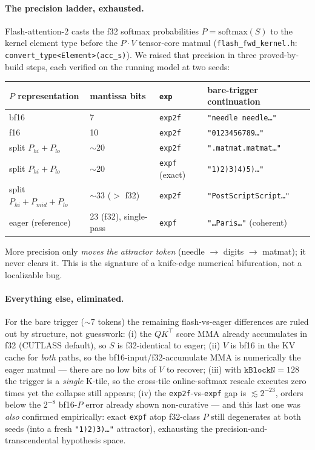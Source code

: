 \documentclass[11pt]{article}
\begin{document}
\paragraph{The precision ladder, exhausted.} Flash-attention-2 casts the f32 softmax probabilities
$P=\mathrm{softmax}(S)$ to the kernel element type before the $P\!\cdot\!V$ tensor-core matmul
(\texttt{flash\_fwd\_kernel.h}: \texttt{convert\_type<Element>(acc\_s)}). We raised that precision in
three proved-by-build steps, each verified on the running model at two seeds:
\begin{center}\small
\begin{tabular}{@{}llll@{}}
\toprule
$P$ representation & mantissa bits & \texttt{exp} & bare-trigger continuation \\
\midrule
bf16               & 7  & \texttt{exp2f} & \texttt{"needle needle\dots"} \\
f16                & 10 & \texttt{exp2f} & \texttt{"0123456789\dots"} \\
split $P_{hi}{+}P_{lo}$ & $\sim$20 & \texttt{exp2f} & \texttt{".matmat.matmat\dots"} \\
split $P_{hi}{+}P_{lo}$ & $\sim$20 & \texttt{expf} (exact) & \texttt{"1)2)3)4)5)\dots"} \\
split $P_{hi}{+}P_{mid}{+}P_{lo}$ & $\sim$33 ($>$ f32) & \texttt{exp2f} & \texttt{"PostScriptScript\dots"} \\
eager (reference)  & 23 (f32), single-pass & \texttt{expf} & \texttt{"\dots Paris\dots"} (coherent) \\
\bottomrule
\end{tabular}
\end{center}
More precision only \emph{moves the attractor token} (needle $\to$ digits $\to$ matmat); it never
clears it. This is the signature of a knife-edge numerical bifurcation, not a localizable bug.

\paragraph{Everything else, eliminated.} For the bare trigger ($\sim$7 tokens) the remaining
flash-vs-eager differences are ruled out by structure, not guesswork: (i) the $QK^\top$ score MMA
already accumulates in f32 (CUTLASS default), so $S$ is f32-identical to eager; (ii) $V$ is bf16 in
the KV cache for \emph{both} paths, so the bf16-input/f32-accumulate MMA is numerically the eager
matmul --- there are no low bits of $V$ to recover; (iii) with $\texttt{kBlockN}=128$ the trigger is
a \emph{single} K-tile, so the cross-tile online-softmax rescale executes zero times yet the collapse
still appears; (iv) the \texttt{exp2f}-vs-\texttt{expf} gap is $\lesssim 2^{-23}$, orders below the
$2^{-8}$ bf16-$P$ error already shown non-curative --- and this last one was \emph{also} confirmed
empirically: exact \texttt{expf} atop f32-class $P$ still degenerates at both seeds (into a fresh
\texttt{"1)2)3)\dots"} attractor), exhausting the precision-and-transcendental hypothesis space.
\end{document}
